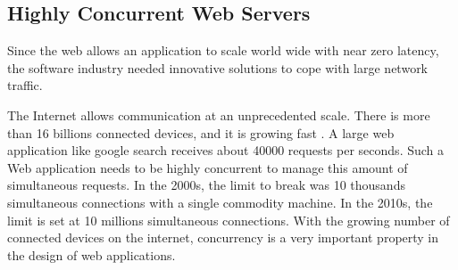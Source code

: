 

\subsection{Highly Concurrent Web Servers} \label{chapter2:web-as-a-platform:web-servers}


Since the web allows an application to scale world wide with near zero latency, the software industry needed innovative solutions to cope with large network traffic.


The Internet allows communication at an unprecedented scale.
There is more than 16 billions connected devices, and it is growing fast \cite{Hilbert2011}.
A large web application like google search receives about \num{40000} requests per seconds.
Such a Web application needs to be highly concurrent to manage this amount of simultaneous requests.
In the 2000s, the limit to break was 10 thousands simultaneous connections with a single commodity machine.
In the 2010s, the limit is set at 10 millions simultaneous connections.
With the growing number of connected devices on the internet, concurrency is a very important property in the design of web applications.

